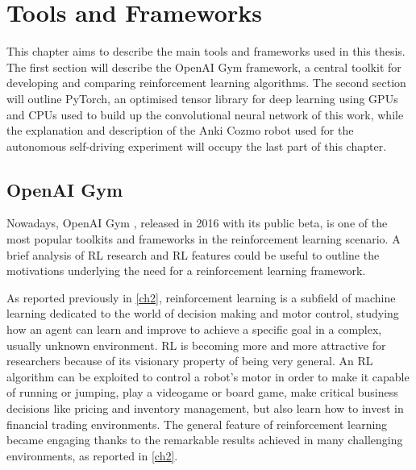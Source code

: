 
\chapter{Tools and Frameworks}

This chapter aims to describe the main tools and frameworks used in this thesis. The first section will describe the OpenAI Gym framework, a central toolkit for developing and comparing reinforcement learning algorithms. The second section will outline PyTorch, an optimised tensor library for deep learning using GPUs and CPUs used to build up the convolutional neural network of this work, while the explanation and description of the Anki Cozmo robot used for the autonomous self-driving experiment will occupy the last part of this chapter.

\section{OpenAI Gym}

Nowadays, OpenAI Gym \cite{openaigymgithub,openaigymdocs,openaigymwhite}, released in 2016 with its public beta, is one of the most popular toolkits and frameworks in the reinforcement learning scenario. A brief analysis of RL research and RL features could be useful to outline the motivations underlying the need for a reinforcement learning framework.

As reported previously in  \vref{ch2}, reinforcement learning is a subfield of machine learning dedicated to the world of decision making and motor control, studying how an agent can learn and improve to achieve a specific goal in a complex, usually unknown environment. RL is becoming more and more attractive for researchers because of its visionary property of being very general. An RL algorithm can be exploited to control a robot's motor in order to make it capable of running or jumping, play a videogame or board game, make critical business decisions like pricing and inventory management, but also learn how to invest in financial trading environments. The general feature of reinforcement learning became engaging thanks to the remarkable results achieved in many challenging environments, as reported in \vref{ch2}.

